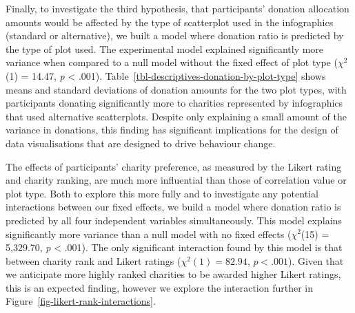 \documentclass[
  authoryear,
  preprint,
  3p]{elsarticle}
\begin{document}
Finally, to investigate the third hypothesis, that participants'
donation allocation amounts would be affected by the type of scatterplot
used in the infographics (standard or alternative), we built a model
where donation ratio is predicted by the type of plot used. The
experimental model explained significantly more variance when compared
to a null model without the fixed effect of plot type (\(\chi^2\)(1) =
14.47, \emph{p} \textless{} .001).
Table~\ref{tbl-descriptives-donation-by-plot-type} shows means and
standard deviations of donation amounts for the two plot types, with
participants donating significantly more to charities represented by
infographics that used alternative scatterplots. Despite only explaining
a small amount of the variance in donations, this finding has
significant implications for the design of data visualisations that are
designed to drive behaviour change.

\begin{table}

\caption{\label{tbl-descriptives-donation-by-plot-type}Means and
standard deviations of donation allocation amounts for standard and
alternative plot types.}


\end{table}%

The effects of participants' charity preference, as measured by the
Likert rating and charity ranking, are much more influential than those
of correlation value or plot type. Both to explore this more fully and
to investigate any potential interactions between our fixed effects, we
build a model where donation ratio is predicted by all four independent
variables simultaneously. This model explains significantly more
variance than a null model with no fixed effects (\(\chi^2\)(15) =
5,329.70, \emph{p} \textless{} .001). The only significant interaction
found by this model is that between charity rank and Likert ratings
(\(\chi^2(1) = 82.94\), \(p < .001\)). Given that we anticipate more
highly ranked charities to be awarded higher Likert ratings, this is an
expected finding, however we explore the interaction further in
Figure~\ref{fig-likert-rank-interactions}.
\end{document}
